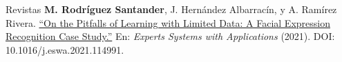 

\begin{cventries}

  \cventry
    {} %
    {Revistas} %
    {} %
    {} %
    {
      \textbf{M. Rodríguez Santander}, J. Hernández Albarracín, y A. Ramírez Rivera. \href{https://www.sciencedirect.com/science/article/pii/S0957417421004322}{``On the Pitfalls of Learning with Limited Data: A Facial Expression Recognition Case Study.''} En: \textit{Experts Systems with Applications} (2021). DOI: 10.1016/j.eswa.2021.114991.
    }

\end{cventries}
